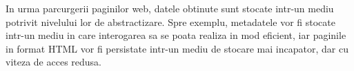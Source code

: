In urma parcurgerii paginilor web, datele obtinute sunt stocate intr-un mediu potrivit nivelului lor de abstractizare. Spre exemplu, metadatele vor fi stocate intr-un mediu in care interogarea sa se poata realiza in mod eficient, iar paginile in format HTML vor fi persistate intr-un mediu de stocare mai incapator, dar cu viteza de acces redusa.
\\
